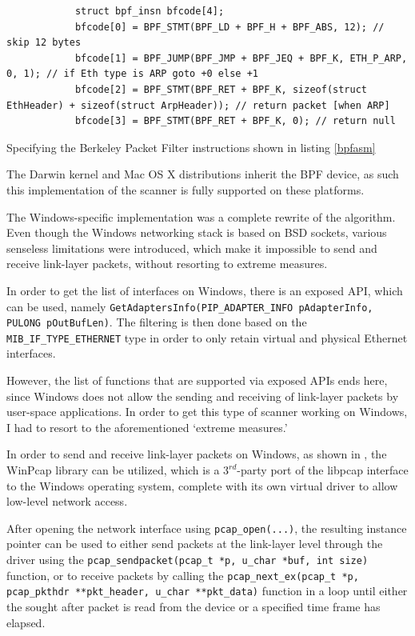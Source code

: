 \documentclass[a4paper,12pt]{article}
\begin{document}
	\begin{listing}[H]
		\begin{verbatim}
			struct bpf_insn bfcode[4];
			bfcode[0] = BPF_STMT(BPF_LD + BPF_H + BPF_ABS, 12); // skip 12 bytes
			bfcode[1] = BPF_JUMP(BPF_JMP + BPF_JEQ + BPF_K, ETH_P_ARP, 0, 1); // if Eth type is ARP goto +0 else +1
			bfcode[2] = BPF_STMT(BPF_RET + BPF_K, sizeof(struct EthHeader) + sizeof(struct ArpHeader)); // return packet [when ARP]
			bfcode[3] = BPF_STMT(BPF_RET + BPF_K, 0); // return null
		\end{verbatim}
		\caption{Specifying the Berkeley Packet Filter instructions shown in listing \ref{bpfasm}}
		\label{bpfcpp}
	\end{listing}
	
	The Darwin kernel and Mac OS X distributions inherit the BPF device, as such this implementation of the scanner is fully supported on these platforms.

 

	The Windows-specific implementation was a complete rewrite of the algorithm. Even though the Windows networking stack is based on BSD sockets, various senseless limitations were introduced, which make it impossible to send and receive link-layer packets, without resorting to extreme measures.

	In order to get the list of interfaces on Windows, there is an exposed API, which can be used, namely \texttt{GetAdaptersInfo(PIP_ADAPTER_INFO pAdapterInfo, PULONG pOutBufLen)}. The filtering is then done based on the \texttt{MIB_IF_TYPE_ETHERNET} type in order to only retain virtual and physical Ethernet interfaces.
	
	However, the list of functions that are supported via exposed APIs ends here, since Windows does not allow the sending and receiving of link-layer packets by user-space applications. In order to get this type of scanner working on Windows, I had to resort to the aforementioned `extreme measures.'
	
	In order to send and receive link-layer packets on Windows, as shown in \cite{xing10}, the WinPcap library can be utilized, which is a $3^{rd}$-party port of the libpcap interface to the Windows operating system, complete with its own virtual driver to allow low-level network access.
	
	After opening the network interface using \texttt{pcap_open(...)}, the resulting instance pointer can be used to either send packets at the link-layer level through the driver using the \texttt{pcap_sendpacket(pcap_t *p, u_char *buf, int size)} function, or to receive packets by calling the \texttt{pcap_next_ex(pcap_t *p, pcap_pkthdr **pkt_header, u_char **pkt_data)} function in a loop until either the sought after packet is read from the device or a specified time frame has elapsed.
	
\end{document}
